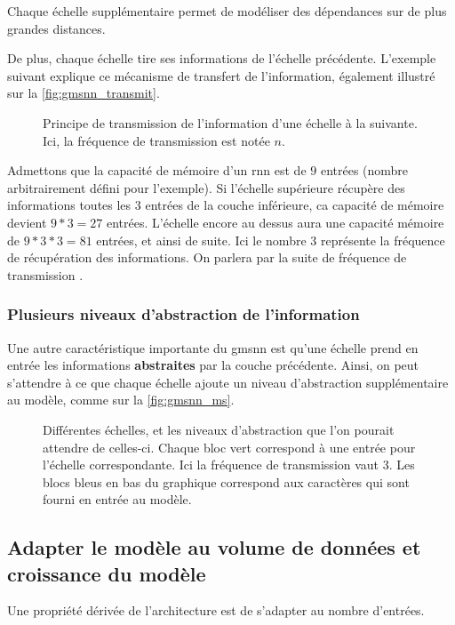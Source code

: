 {Chaque échelle supplémentaire permet de modéliser des dépendances sur de plus grandes distances.

De plus, chaque échelle tire ses informations de l'échelle précédente.
L'exemple suivant explique ce mécanisme de transfert de l'information, également illustré sur la \autoref{fig:gmsnn_transmit}.

\begin{figure}[ht]
	\centering
	
	\label{fig:gmsnn_transmit}
	\caption[Principe de transmission de l'information d'une échelle à la suivante.]{Principe de transmission de l'information d'une échelle à la suivante. Ici, la fréquence de transmission est notée $n$.}
\end{figure}

Admettons que la capacité de mémoire d'un \gls{rnn} est de $9$ entrées (nombre arbitrairement défini pour l'exemple).
Si l'échelle supérieure récupère des informations toutes les $3$ entrées de la couche inférieure, ca capacité de mémoire devient $9*3=27$ entrées.
L'échelle encore au dessus aura une capacité mémoire de  $9*3*3=81$ entrées, et ainsi de suite.
Ici le nombre $3$ représente la fréquence de récupération des informations. On parlera par la suite de \og fréquence de transmission \fg{}.

\subsubsection{Plusieurs niveaux d'abstraction de l'information}
Une autre caractéristique importante du \gls{gmsnn} est qu'une échelle prend en entrée les informations \textbf{abstraites} par la couche précédente.
Ainsi, on peut s'attendre à ce que chaque échelle ajoute un niveau d'abstraction supplémentaire au modèle, comme sur la \autoref{fig:gmsnn_ms}.

\begin{figure}[ht]
	\centering
	
	\caption[Différentes échelles, et les niveaux d'abstraction correspondants.]{%
		Différentes échelles, et les niveaux d'abstraction que l'on pourait attendre de celles-ci.
		Chaque bloc vert correspond à une entrée pour l'échelle correspondante.
		Ici la fréquence de transmission vaut 3.
		Les blocs bleus en bas du graphique correspond aux caractères qui sont fourni en entrée au modèle.}
	\label{fig:gmsnn_ms}
\end{figure}

\subsection{Adapter le modèle au volume de données et croissance du modèle}
Une propriété dérivée de l'architecture est de s'adapter au nombre d'entrées.

}
